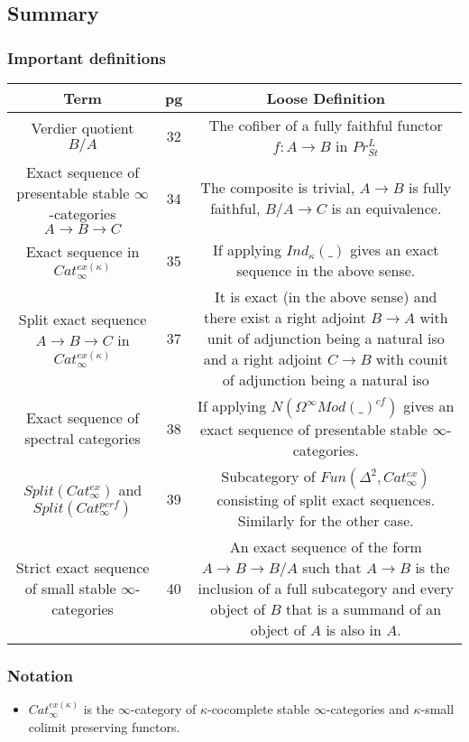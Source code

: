 \documentclass[letterpaper]{article}
\theoremstyle{definition}
\begin{document}
\subsection{Summary}

\subsubsection{Important definitions}
\begin{tabulary}{0.7\textwidth}{|C|C|C|}
\hline
Term & pg & Loose Definition\\
\hline
\hline
Verdier quotient $B/A$ & 32 & The cofiber of a fully faithful functor $f : A \rightarrow B$ in $Pr^L_{St}$\\
\hline
Exact sequence of presentable stable $\infty$-categories $A \rightarrow B \rightarrow C$ & 34 & The composite is trivial, $A \rightarrow B$ is fully faithful, $B/A \rightarrow C$ is an equivalence.\\
\hline
Exact sequence in $Cat_\infty^{ex(\kappa)}$ & 35 & If applying $Ind_\kappa(\_)$ gives an exact sequence in the above sense. \\
\hline
Split exact sequence $A \rightarrow B \rightarrow C$ in $Cat_\infty^{ex(\kappa)}$ & 37 & It is exact (in the above sense) and there exist a right adjoint $B \rightarrow A$  with unit of adjunction being a natural iso and a right adjoint $C \rightarrow B$ with counit of adjunction being a natural iso\\
\hline
Exact sequence of spectral categories & 38 & If applying $N(\Omega^\infty Mod(\_)^{cf})$ gives an exact sequence of presentable stable $\infty$-categories.\\
\hline
$Split(Cat_\infty^{ex})$ and $Split(Cat_\infty^{perf})$ & 39 & Subcategory of $Fun(\Delta^2, Cat_\infty^{ex})$ consisting of split exact sequences. Similarly for the other case. \\
\hline
Strict exact sequence of small stable $\infty$-categories & 40 & An exact sequence of the form $A \rightarrow B \rightarrow B/A$ such that $A \rightarrow B$ is the inclusion of a full subcategory and every object of $B$ that is a summand of an object of $A$ is also in $A$. \\
\hline
\end{tabulary}

\subsubsection{Notation}
\begin{itemize}
\item $Cat_\infty^{ex(\kappa)}$ is the $\infty$-category of $\kappa$-cocomplete stable $\infty$-categories and $\kappa$-small colimit preserving functors.
\end{itemize}
\end{document}

